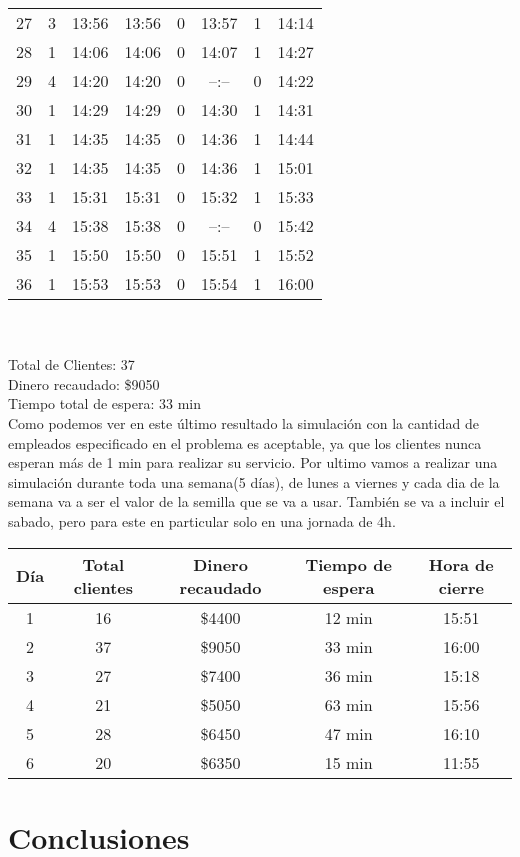 \documentclass[12pt]{article}
\begin{document}
\begin{tabular}{|c|c|c|c|c|c|c|c|}
27&3 & 13:56 & 13:56 & 0 & 13:57 & 1 & 14:14\\
28&1 & 14:06 & 14:06 & 0 & 14:07 & 1 & 14:27\\
29&4 & 14:20 & 14:20 & 0 & --:-- & 0 & 14:22\\
30&1 & 14:29 & 14:29 & 0 & 14:30 & 1 & 14:31\\
31&1 & 14:35 & 14:35 & 0 & 14:36 & 1 & 14:44\\
32&1 & 14:35 & 14:35 & 0 & 14:36 & 1 & 15:01\\
33&1 & 15:31 & 15:31 & 0 & 15:32 & 1 & 15:33\\
34&4 & 15:38 & 15:38 & 0 & --:-- & 0 & 15:42\\
35&1 & 15:50 & 15:50 & 0 & 15:51 & 1 & 15:52\\
36&1 & 15:53 & 15:53 & 0 & 15:54 & 1 & 16:00\\
\hline
\end{tabular}\\
\\

\noindent Total de Clientes: 37\\
Dinero recaudado: \$9050\\
Tiempo total de espera: 33 min\\

Como podemos ver en este \'ultimo resultado la simulaci\'on con la cantidad de empleados especificado en el problema es aceptable, ya que los clientes nunca esperan m\'as de 1 min para realizar su servicio.
Por ultimo vamos a realizar una simulaci\'on durante toda una semana(5 d\'ias), de lunes a viernes y cada dia de la semana va a ser el valor de la semilla que se va a usar. Tambi\'en se va a incluir el sabado, pero para este en particular solo en una jornada de 4h.\\

\begin{tabular}{|c|c|c|c|c|}
\hline
D\'ia & Total clientes & Dinero recaudado & Tiempo de espera & Hora de cierre \\ 
\hline
1 & 16 & \$4400 & 12 min & 15:51 \\
2 & 37 & \$9050 & 33 min & 16:00 \\
3 & 27 & \$7400 & 36 min & 15:18 \\
4 & 21 & \$5050 & 63 min & 15:56 \\
5 & 28 & \$6450 & 47 min & 16:10 \\
6 & 20 & \$6350 & 15 min & 11:55 \\
\hline
\end{tabular}
\section*{Conclusiones}
\end{document}
